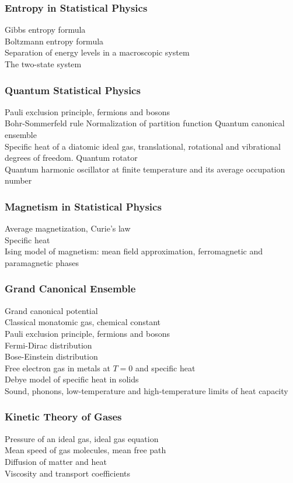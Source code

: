 \documentclass[11pt, a4paper]{article}
\begin{document}
\subsubsection{Entropy in Statistical Physics}
Gibbs entropy formula\\
Boltzmann entropy formula\\
Separation of energy levels in a macroscopic system\\
The two-state system

\subsubsection{Quantum Statistical Physics}
Pauli exclusion principle, fermions and bosons\\
Bohr-Sommerfeld rule
Normalization of partition function
Quantum canonical ensemble\\
Specific heat of a diatomic ideal gas, translational, rotational and vibrational degrees of freedom.
Quantum rotator\\
Quantum harmonic oscillator at finite temperature and its average occupation number

\subsubsection{Magnetism in Statistical Physics}
Average magnetization, Curie's law\\
Specific heat\\
Ising model of magnetism: mean field approximation, ferromagnetic and paramagnetic phases

\subsubsection{Grand Canonical Ensemble}
Grand canonical potential\\
Classical monatomic gas, chemical constant\\
Pauli exclusion principle, fermions and bosons\\
Fermi-Dirac distribution\\
Bose-Einstein distribution\\
Free electron gas in metals at $ T = 0 $ and specific heat\\
Debye model of specific heat in solids\\
Sound, phonons, low-temperature and high-temperature limits of heat capacity

\subsubsection{Kinetic Theory of Gases}
Pressure of an ideal gas, ideal gas equation\\
Mean speed of gas molecules, mean free path\\
Diffusion of matter and heat\\
Viscosity and transport coefficients
\end{document}
